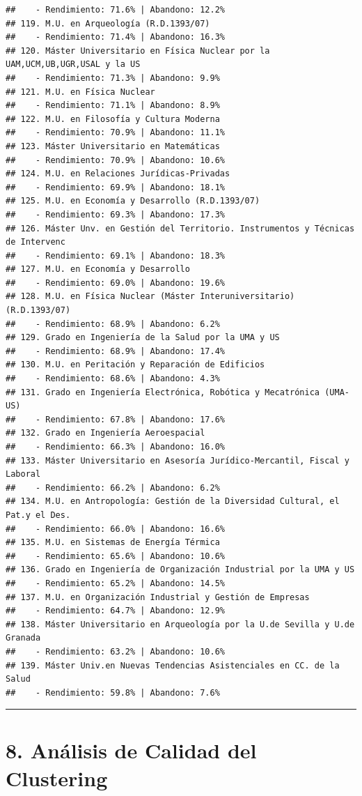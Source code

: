 \documentclass[
]{article}
\begin{document}
\begin{verbatim}
##    - Rendimiento: 71.6% | Abandono: 12.2%
## 119. M.U. en Arqueología (R.D.1393/07)
##    - Rendimiento: 71.4% | Abandono: 16.3%
## 120. Máster Universitario en Física Nuclear por la UAM,UCM,UB,UGR,USAL y la US
##    - Rendimiento: 71.3% | Abandono: 9.9%
## 121. M.U. en Física Nuclear
##    - Rendimiento: 71.1% | Abandono: 8.9%
## 122. M.U. en Filosofía y Cultura Moderna
##    - Rendimiento: 70.9% | Abandono: 11.1%
## 123. Máster Universitario en Matemáticas
##    - Rendimiento: 70.9% | Abandono: 10.6%
## 124. M.U. en Relaciones Jurídicas-Privadas
##    - Rendimiento: 69.9% | Abandono: 18.1%
## 125. M.U. en Economía y Desarrollo (R.D.1393/07)
##    - Rendimiento: 69.3% | Abandono: 17.3%
## 126. Máster Unv. en Gestión del Territorio. Instrumentos y Técnicas de Intervenc
##    - Rendimiento: 69.1% | Abandono: 18.3%
## 127. M.U. en Economía y Desarrollo
##    - Rendimiento: 69.0% | Abandono: 19.6%
## 128. M.U. en Física Nuclear (Máster Interuniversitario) (R.D.1393/07)
##    - Rendimiento: 68.9% | Abandono: 6.2%
## 129. Grado en Ingeniería de la Salud por la UMA y US
##    - Rendimiento: 68.9% | Abandono: 17.4%
## 130. M.U. en Peritación y Reparación de Edificios
##    - Rendimiento: 68.6% | Abandono: 4.3%
## 131. Grado en Ingeniería Electrónica, Robótica y Mecatrónica (UMA-US)
##    - Rendimiento: 67.8% | Abandono: 17.6%
## 132. Grado en Ingeniería Aeroespacial
##    - Rendimiento: 66.3% | Abandono: 16.0%
## 133. Máster Universitario en Asesoría Jurídico-Mercantil, Fiscal y Laboral
##    - Rendimiento: 66.2% | Abandono: 6.2%
## 134. M.U. en Antropología: Gestión de la Diversidad Cultural, el Pat.y el Des.
##    - Rendimiento: 66.0% | Abandono: 16.6%
## 135. M.U. en Sistemas de Energía Térmica
##    - Rendimiento: 65.6% | Abandono: 10.6%
## 136. Grado en Ingeniería de Organización Industrial por la UMA y US
##    - Rendimiento: 65.2% | Abandono: 14.5%
## 137. M.U. en Organización Industrial y Gestión de Empresas
##    - Rendimiento: 64.7% | Abandono: 12.9%
## 138. Máster Universitario en Arqueología por la U.de Sevilla y U.de Granada
##    - Rendimiento: 63.2% | Abandono: 10.6%
## 139. Máster Univ.en Nuevas Tendencias Asistenciales en CC. de la Salud
##    - Rendimiento: 59.8% | Abandono: 7.6%
\end{verbatim}

\begin{center}\rule{0.5\linewidth}{0.5pt}\end{center}

\section{8. Análisis de Calidad del
Clustering}\label{anuxe1lisis-de-calidad-del-clustering}
\end{document}
